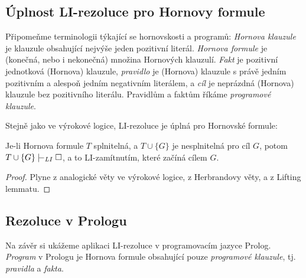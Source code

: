 \subsection{Úplnost LI-rezoluce pro Hornovy formule}

Připomeňme terminologii týkající se hornovskosti a programů: \emph{Hornova klauzule} je klauzule obsahující nejvýše jeden pozitivní literál. \emph{Hornova formule} je (konečná, nebo i nekonečná) množina Hornových klauzulí.
\emph{Fakt} je pozitivní jednotková (Hornova) klauzule, \emph{pravidlo} je (Hornova) klauzule s právě jedním pozitivním a alespoň jedním negativním literálem, a \emph{cíl} je neprázdná (Hornova) klauzule bez pozitivního literálu. Pravidlům a faktům říkáme \emph{programové klauzule}.

Stejně jako ve výrokové logice, LI-rezoluce je úplná pro Hornovské formule:

\begin{theorem}\label{theorem:completeness-of-li-resolution-for-horn-predicate}
Je-li Hornova formule $T$ splnitelná, a $T\cup\{G\}$ je nesplnitelná pro cíl $G$, potom $T\cup\{G\}\proves_{LI}\square$, a to LI-zamítnutím, které začíná cílem $G$.   
\end{theorem}
\begin{proof}
    Plyne z analogické věty ve výrokové logice, z Herbrandovy věty, a z Lifting lemmatu.
\end{proof}


\subsection{Rezoluce v Prologu}


Na závěr si ukážeme aplikaci LI-rezoluce v programovacím jazyce Prolog. \emph{Program} v Prologu je Hornova formule obsahující pouze \emph{programové klauzule}, tj. \emph{pravidla} a \emph{fakta}.

